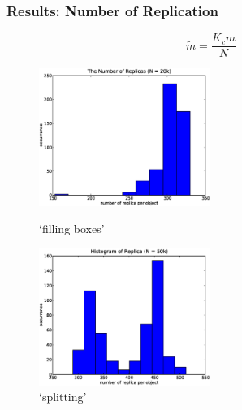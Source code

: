 \documentclass[red]{beamer}
\begin{document}
\begin{frame}
\frametitle{Results: Number of Replication}
\begin{equation}
\tilde m = \frac{K_c m}{N}
\end{equation}
\begin{figure}
\begin{minipage}{5cm}
\centering
\includegraphics[width=2.2in]{figs/rep_obj_20k.eps}
\caption{`filling boxes'} 
\end{minipage}
\begin{minipage}{5cm}
\centering
\includegraphics[width=2.2in]{figs/rep_obj_50k.eps}
\caption{`splitting'}
\end{minipage}
\end{figure}
\end{frame}
\end{document}
